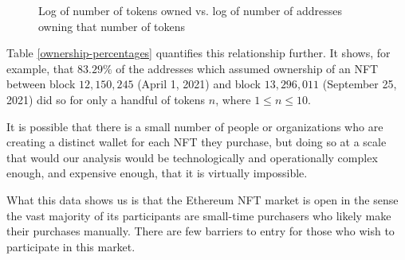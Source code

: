 \documentclass{article}
\begin{document}
\begin{figure}
\caption{Log of number of tokens owned vs. log of number of addresses owning that number of tokens}\label{zipf}
\end{figure}

Table \ref{ownership-percentages} quantifies this relationship further. It shows, for example, that $83.29\%$ of the addresses which assumed ownership of an NFT between block $12,150,245$ (April 1, 2021) and block $13,296,011$ (September 25, 2021) did so for only a handful of tokens $n$, where $1 \leq n \leq 10$.

\begin{table}
\caption{Number of addresses by NFTs owned}\label{ownership-percentages}
\end{table}

It is possible that there is a small number of people or organizations who are creating a distinct wallet for each NFT they purchase, but doing so at a scale that would our analysis would be technologically and operationally complex enough, and expensive enough, that it is virtually impossible.

What this data shows us is that the Ethereum NFT market is open in the sense the vast majority of its participants are small-time purchasers who likely make their purchases manually. There are few barriers to entry for those who wish to participate in this market.
\end{document}
